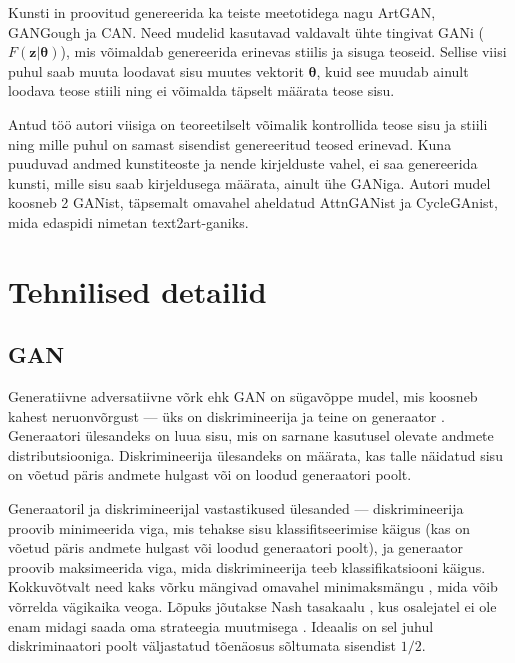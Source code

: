 \documentclass{vilgym}
\begin{document}
	Kunsti in proovitud genereerida ka teiste meetotidega nagu ArtGAN\parencite{artgan}, GANGough ja CAN\parencite{can}. Need mudelid kasutavad valdavalt ühte tingivat GANi ($ F(\boldsymbol{z}|\boldsymbol{\theta}) $), mis võimaldab genereerida erinevas stiilis ja sisuga teoseid. Sellise viisi puhul saab muuta loodavat sisu muutes vektorit $ \boldsymbol{\theta} $, kuid see muudab ainult loodava teose stiili ning ei võimalda täpselt määrata teose sisu. 

	Antud töö autori viisiga on teoreetilselt võimalik kontrollida teose sisu ja stiili ning mille puhul on samast sisendist genereeritud teosed erinevad. Kuna puuduvad andmed kunstiteoste ja nende kirjelduste vahel, ei saa genereerida kunsti, mille sisu saab kirjeldusega määrata, ainult ühe GANiga. Autori mudel koosneb 2 GANist, täpsemalt omavahel aheldatud AttnGANist ja CycleGAnist, mida edaspidi nimetan text2art-ganiks.


	\section{Tehnilised detailid}
	\subsection{GAN}
	Generatiivne adversatiivne võrk ehk GAN  on sügavõppe mudel, mis koosneb kahest neruonvõrgust --- üks on diskrimineerija  ja teine on generaator .  Generaatori ülesandeks on luua sisu, mis on sarnane kasutusel olevate andmete distributsiooniga. Diskrimineerija ülesandeks on määrata, kas talle näidatud sisu on võetud päris andmete hulgast või on loodud generaatori poolt.
	
	Generaatoril ja diskrimineerijal vastastikused ülesanded --- diskrimineerija proovib minimeerida viga, mis tehakse sisu klassifitseerimise käigus (kas on võetud päris andmete hulgast või loodud generaatori poolt), ja generaator proovib maksimeerida viga, mida diskrimineerija teeb klassifikatsiooni käigus. Kokkuvõtvalt need kaks võrku mängivad omavahel minimaksmängu , mida võib võrrelda vägikaika veoga. Lõpuks jõutakse Nash tasakaalu , kus osalejatel ei ole enam midagi saada oma strateegia muutmisega \parencite{gametheory}. Ideaalis on sel juhul diskriminaatori poolt väljastatud tõenäosus sõltumata sisendist $ 1/2 $.
\end{document}
